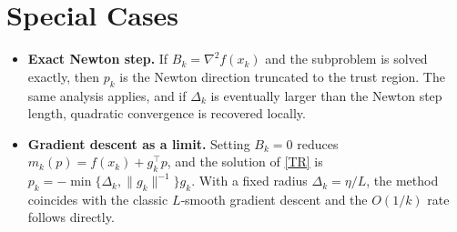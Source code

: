 \documentclass{article}
\begin{document}
\section*{Special Cases}
\begin{itemize}
\item \textbf{Exact Newton step.}  If $B_k=\nabla^{2}f(x_k)$ and the subproblem is solved exactly, then $p_k$ is the Newton direction truncated to the trust region. The same analysis applies, and if $\Delta_k$ is eventually larger than the Newton step length, quadratic convergence is recovered locally.
\item \textbf{Gradient descent as a limit.}  Setting $B_k=0$ reduces $m_k(p)=f(x_k)+g_k^{\top}p$, and the solution of \eqref{TR} is $p_k=-\min\{\Delta_k,\|g_k\|^{-1}\}g_k$. With a fixed radius $\Delta_k=\eta/L$, the method coincides with the classic $L$‑smooth gradient descent and the $O(1/k)$ rate follows directly.
\end{itemize}
\end{document}
